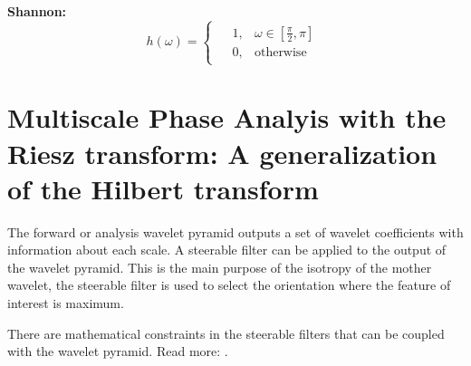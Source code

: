 \documentclass{InsightArticle}
\theoremstyle{definition}
\begin{document}
\noindent\begin{minipage}[t]{0.49\textwidth}
\textbf{Shannon:}
\begin{equation*}
\label{Shannon}
  h(\omega) =
    \begin{cases}
    \begin{aligned}
  &1, &\omega \in [\frac{\pi}{2} , \pi ] \\
  &0, &\text{otherwise}
    \end{aligned}
    \end{cases}
\end{equation*}
\end{minipage}
%

\section{Multiscale Phase Analyis with the Riesz transform: A generalization of the Hilbert transform}
\label{sec:Riesz}
The forward or analysis wavelet pyramid outputs a set of wavelet coefficients with information about each scale.
A steerable filter \cite{held_steerable_2010, unser_steerable_2011, simoncelli_steerable_1995} can be applied to the output of the wavelet pyramid. This is the main purpose of the isotropy of the mother wavelet, the steerable filter is used to select the orientation where the feature of interest is maximum.

There are mathematical constraints in the steerable filters that can be coupled with the wavelet pyramid. Read more: \cite{unser_multiresolution_2009, unser_steerable_2011}.
\end{document}

